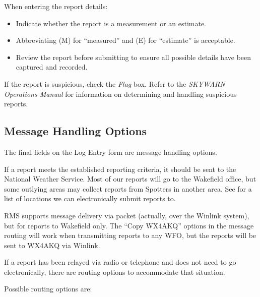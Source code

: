 \documentclass[pdflatex,letterpaper,twoside,12pt]{book}
\begin{document}
When entering the report details:

\begin{itemize}
\item Indicate whether the report is a measurement or an estimate.
\item Abbreviating (M) for ``measured'' and (E) for ``estimate'' is acceptable.
\item Review the report before submitting to ensure all possible details have been captured and recorded.
\end{itemize}

If the report is suspicious, check the \emph{Flag} box.  Refer to the \emph{SKYWARN Operations Manual} for information on determining and handling suspicious reports. 

\subsection{Message Handling Options}

The final fields on the Log Entry form are message handling options.

If a report meets the established reporting criteria, it should be sent to the National Weather Service.  Most of our reports will go to the Wakefield office, but some outlying areas may collect reports from Spotters in another area.  See  for a list of locations we can electronically submit reports to.


RMS supports message delivery via packet (actually, over the Winlink system), but for reports to Wakefield only.  The ``Copy WX4AKQ'' options in the message routing will work when transmitting reports to any WFO, but the reports will be sent to WX4AKQ via Winlink.

If a report has been relayed via radio or telephone and does not need to go electronically, there are routing options to accommodate that situation.

Possible routing options are:
\end{document}
